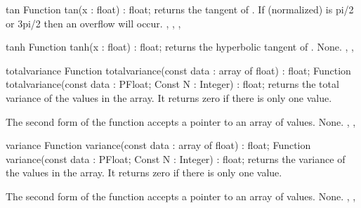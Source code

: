 

\begin{function}{tan}
\Declaration
Function tan(x : float) : float;
\Description
{} returns the tangent of .
\Errors
If  (normalized) is pi/2 or 3pi/2 then an overflow will occur.
\SeeAlso
{}, , , 
\end{function}



\begin{function}{tanh}
\Declaration
Function tanh(x : float) : float;
\Description
{} returns the hyperbolic tangent of .
\Errors
None.
\SeeAlso
{}, , 
\end{function}



\begin{function}{totalvariance}
\Declaration
Function totalvariance(const data : array of float) : float;
Function totalvariance(const data : PFloat; Const N : Integer) : float;
\Description
{} returns the total variance of the values in the 
 array. It returns zero if there is only one value.

The second form of the function accepts a pointer to an array of 
values.
\Errors
None.
\SeeAlso
{}, , 
\end{function}



\begin{function}{variance}
\Declaration
Function variance(const data : array of float) : float;
Function variance(const data : PFloat; Const N : Integer) : float;
\Description
{} returns the variance of the values in the 
 array. It returns zero if there is only one value.

The second form of the function accepts a pointer to an array of 
values.
\Errors
None.
\SeeAlso
{}, , 
\end{function}

